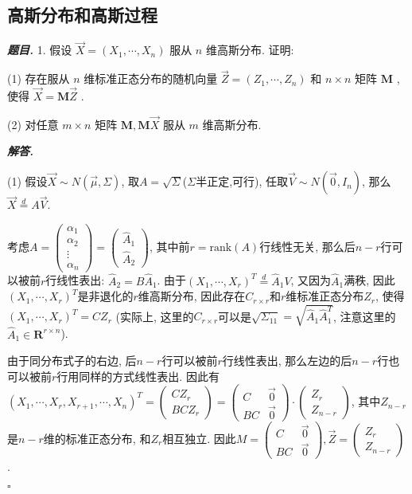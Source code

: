 \documentclass[10pt, a4paper, oneside]{ctexart}
\newenvironment{problem}{\begin{framed}\par\noindent\textbf{\textit{题目. }}}{\end{framed}\par}
\newenvironment{solution}{%
  \par\noindent\textbf{\textit{解答. }}\ignorespaces
}{%
  \hfill\ensuremath{\square}\par %
}
\begin{document}
\subsection{高斯分布和高斯过程}
\begin{problem}
    1. 假设 \( \overrightarrow{X} = \left( {{X}_{1},\cdots ,{X}_{n}}\right)  \) 服从 \( n \) 维高斯分布. 证明:

(1) 存在服从 \( n \) 维标准正态分布的随机向量 \( \overrightarrow{Z} = \left( {{Z}_{1},\cdots ,{Z}_{n}}\right)  \) 和 \( n \times  n \)  矩阵  \( \mathbf{M} \) ,使得  \( \overrightarrow{X} = \mathbf{M}\overrightarrow{Z} \) .

(2) 对任意 \( m \times  n \) 矩阵 \( \mathbf{M},\mathbf{M}\overrightarrow{X} \) 服从 \( m \) 维高斯分布.
\end{problem}
\begin{solution}

(1) 假设$\vec{X}\sim N(\vec{\mu},\Sigma)$, 取$A=\sqrt{\Sigma}$($\Sigma$半正定,可行), 任取$\vec{V}\sim N(\vec{0},I_n)$, 那么$\vec{X}\overset{d}{=}A\vec{V}$. 

考虑$A=\begin{pmatrix}
    \alpha_1 \\ \alpha_2\\ \vdots \\\alpha_n
\end{pmatrix}=\begin{pmatrix}
\hat{A}_1 \\ \hat{A}_2
\end{pmatrix}$, 其中前$r=\text{rank}(A)$行线性无关, 那么后$n-r$行可以被前$r$行线性表出: $\hat{A}_2=B\hat{A}_1$. 由于$(X_1,\cdots,X_r)^T \overset{d}{=}\hat{A}_1V$, 又因为$\hat{A}_1$满秩, 因此$(X_1,\cdots,X_r)^T$是非退化的$r$维高斯分布, 因此存在$C_{r\times r}$和$r$维标准正态分布$Z_{r}$, 使得$(X_1,\cdots,X_r)^T=CZ_r$ (实际上, 这里的$C_{r\times r}$可以是$\sqrt{\Sigma_{11}}=\sqrt{\hat{A}_1\hat{A}_1^T}$, 注意这里的$\hat{A}_1\in \mathbf{R}^{r\times n}$). 

由于同分布式子的右边, 后$n-r$行可以被前$r$行线性表出, 那么左边的后$n-r$行也可以被前$r$行用同样的方式线性表出. 因此有$(X_1,\cdots,X_r,X_{r+1},\cdots,X_n)^T=\begin{pmatrix}
    CZ_r \\ BCZ_r
\end{pmatrix}=\begin{pmatrix}
    C & \vec{0}\\ BC & \vec{0}
\end{pmatrix}\cdot \begin{pmatrix}
    Z_r \\ Z_{n-r}
\end{pmatrix}$, 其中$Z_{n-r}$是$n-r$维的标准正态分布, 和$Z_r$相互独立. 因此$M=\begin{pmatrix}
    C & \vec{0}\\ BC & \vec{0}
\end{pmatrix}, \vec{Z}=\begin{pmatrix}
    Z_r \\ Z_{n-r}
\end{pmatrix}$.


\end{solution}
\end{document}
